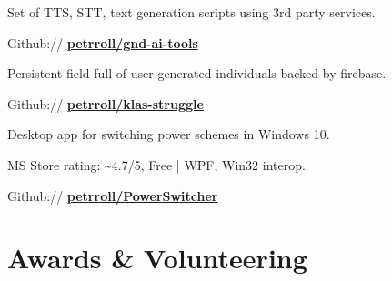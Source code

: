 \documentclass[a4paper]{deedy-resume} %
\begin{document}
\begin{minipage}[t]{0.62\textwidth}
\sectionspace %


\emptyLocation %
\begin{tightitemize}
\item Set of TTS, STT, text generation scripts using 3rd party services.
\item Github:// \href{https://github.com/petrroll/gnd-ai-tools}{\bf petrroll/gnd-ai-tools}
\end{tightitemize}

\sectionspace %



\emptyLocation %
\begin{tightitemize}
\item Persistent field full of user-generated individuals backed by firebase.
\item Github:// \href{https://github.com/petrroll/klas-struggle}{\bf petrroll/klas-struggle}
\end{tightitemize}

\sectionspace %


\emptyLocation %
\begin{tightitemize}
\item Desktop app for switching power schemes in Windows 10.
\item MS Store rating: \textasciitilde4.7/5, Free | WPF, Win32 interop.
\item Github:// \href{https://github.com/petrroll/PowerSwitcher}{\bf petrroll/PowerSwitcher}
\end{tightitemize}

\sectionspace %


\section{Awards \& Volunteering} 


\end{minipage}
\end{document}
